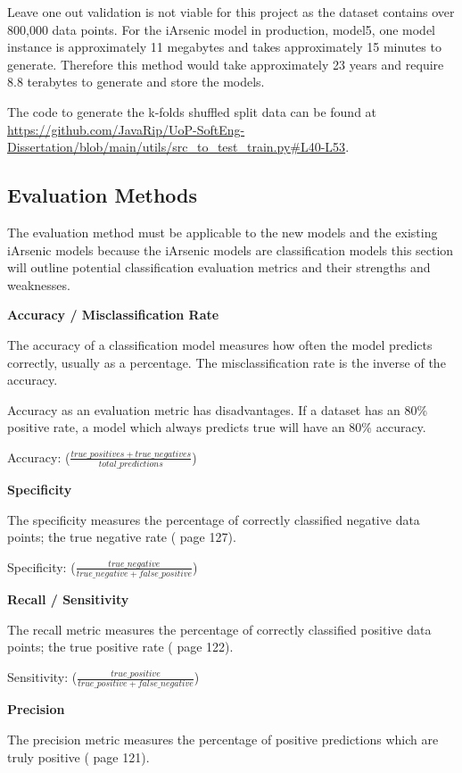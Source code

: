 Leave one out validation is not viable for this project as the dataset contains over 800,000 data points. For the iArsenic model in production, model5, one model instance is approximately 11 megabytes and takes approximately 15 minutes to generate. Therefore this method would take approximately 23 years and require 8.8 terabytes to generate and store the models.

The code to generate the k-folds shuffled split data can be found at \url{https://github.com/JavaRip/UoP-SoftEng-Dissertation/blob/main/utils/src_to_test_train.py#L40-L53}.

\subsection{Evaluation Methods}
\label{EM}

The evaluation method must be applicable to the new models and the existing iArsenic models because the iArsenic models are classification models this section will outline potential classification evaluation metrics and their strengths and weaknesses.

\textbf{Accuracy / Misclassification Rate}

The accuracy of a classification model measures how often the model predicts correctly, usually as a percentage. The misclassification rate is the inverse of the accuracy.

Accuracy as an evaluation metric has disadvantages. If a dataset has an 80\% positive rate, a model which always predicts true will have an 80\% accuracy.

Accuracy: (\(\frac{true\_positives + true\_negatives}{total\_predictions}\))

\textbf{Specificity}

The specificity measures the percentage of correctly classified negative data points; the true negative rate (\cite{Aurélien2017} page 127).

Specificity: (\(\frac{true\_negative}{true\_negative + false\_positive}\))

\textbf{Recall / Sensitivity}

The recall metric measures the percentage of correctly classified positive data points; the true positive rate (\cite{Aurélien2017} page 122).

Sensitivity: (\(\frac{true\_positive}{true\_positive + false\_negative}\))

\textbf{Precision}

The precision metric measures the percentage of positive predictions which are truly positive (\cite{Aurélien2017} page 121).


